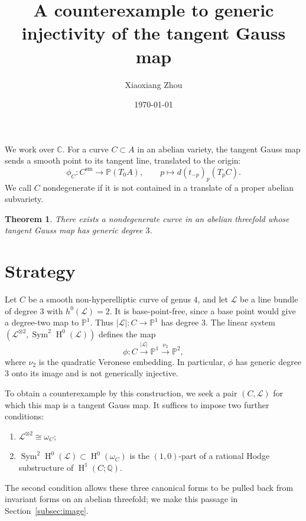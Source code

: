 \documentclass{amsart}
\title[The tangent Gauss map]{A counterexample to generic injectivity of the tangent Gauss map}
\author{Xiaoxiang Zhou}
\date{\today}
\newtheorem{theorem}{Theorem}
\DeclareMathOperator{\Sym}{Sym}
\DeclareMathOperator{\Hnm}{H}
\begin{document}
\maketitle

We work over $\mathbb{C}$. For a curve $C\subset A$ in an abelian variety,
the tangent Gauss map sends a smooth point to its tangent line, translated
to the origin:
$$
\phi_C:C^{\mathrm{sm}}\longrightarrow\mathbb{P}(T_0A),\qquad
p\longmapsto d(t_{-p})_p(T_pC).
$$
We call $C$ nondegenerate if it is not contained in a translate of a
proper abelian subvariety.

\begin{theorem}\label{thm:weak}
There exists a nondegenerate curve in an abelian threefold whose tangent
Gauss map has generic degree $3$.
\end{theorem}

\section{Strategy}

Let $C$ be a smooth non-hyperelliptic curve of genus $4$, and let
$\mathcal{L}$ be a line bundle of degree $3$ with $h^0(\mathcal{L})=2$.
It is base-point-free, since a base point would give a degree-two map to
$\mathbb{P}^1$.
Thus $|\mathcal{L}|:C\longrightarrow\mathbb{P}^1$ has degree $3$.
The linear system
$\left(\mathcal{L}^{\otimes2},\Sym^2\Hnm^0(\mathcal{L})\right)$
defines the map
$$
\phi:C\overset{|\mathcal{L}|}{\longrightarrow}\mathbb{P}^1
\overset{\nu_2}{\longrightarrow}\mathbb{P}^2,
$$
where $\nu_2$ is the quadratic Veronese embedding. In particular, $\phi$
has generic degree $3$ onto its image and is not generically injective.

To obtain a counterexample by this construction, we seek a pair
$(C,\mathcal{L})$ for which this map is a tangent Gauss map. It suffices
to impose two further conditions:
\begin{enumerate}
\item\label{cond:spin} $\mathcal{L}^{\otimes2}\cong\omega_C$;
\item\label{cond:hodge} $\Sym^2\Hnm^0(\mathcal{L})\subset\Hnm^0(\omega_C)$ is the
$(1,0)$-part of a rational Hodge substructure of
$\Hnm^1(C;\mathbb{Q})$.
\end{enumerate}
The second condition allows these three canonical forms to be pulled
back from invariant forms on an abelian threefold; we make this passage
in Section~\ref{subsec:image}.
\end{document}

